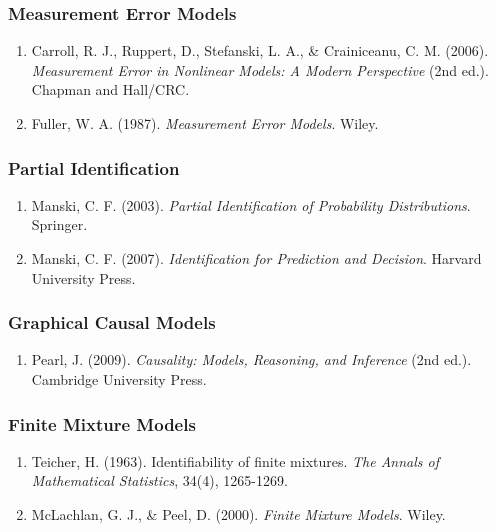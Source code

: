 \documentclass[
  12pt,
]{ctexart}
\providecommand{\tightlist}{%
  \setlength{\itemsep}{0pt}\setlength{\parskip}{0pt}}
\begin{document}
\subsubsection{Measurement Error Models}\label{measurement-error-models}

\begin{enumerate}
\def\labelenumi{\arabic{enumi}.}
\setcounter{enumi}{3}
\tightlist
\item
  Carroll, R. J., Ruppert, D., Stefanski, L. A., \& Crainiceanu, C. M.
  (2006). \emph{Measurement Error in Nonlinear Models: A Modern
  Perspective} (2nd ed.). Chapman and Hall/CRC.
\item
  Fuller, W. A. (1987). \emph{Measurement Error Models}. Wiley.
\end{enumerate}

\subsubsection{Partial Identification}\label{partial-identification}

\begin{enumerate}
\def\labelenumi{\arabic{enumi}.}
\setcounter{enumi}{5}
\tightlist
\item
  Manski, C. F. (2003). \emph{Partial Identification of Probability
  Distributions}. Springer.
\item
  Manski, C. F. (2007). \emph{Identification for Prediction and
  Decision}. Harvard University Press.
\end{enumerate}

\subsubsection{Graphical Causal Models}\label{graphical-causal-models}

\begin{enumerate}
\def\labelenumi{\arabic{enumi}.}
\setcounter{enumi}{7}
\tightlist
\item
  Pearl, J. (2009). \emph{Causality: Models, Reasoning, and Inference}
  (2nd ed.). Cambridge University Press.
\end{enumerate}

\subsubsection{Finite Mixture Models}\label{finite-mixture-models}

\begin{enumerate}
\def\labelenumi{\arabic{enumi}.}
\setcounter{enumi}{8}
\tightlist
\item
  Teicher, H. (1963). Identifiability of finite mixtures. \emph{The
  Annals of Mathematical Statistics}, 34(4), 1265-1269.
\item
  McLachlan, G. J., \& Peel, D. (2000). \emph{Finite Mixture Models}.
  Wiley.
\end{enumerate}
\end{document}
